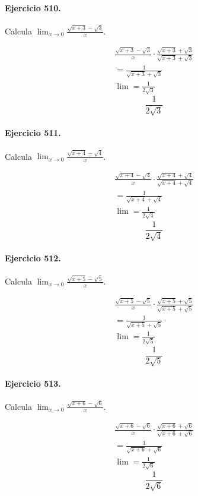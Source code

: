 \documentclass[11pt,a4paper]{article}
\begin{document}
\paragraph{Ejercicio 510.} Calcula $\displaystyle\lim_{x\to0}\frac{\sqrt{x+3}-\sqrt{3}}{x}$.

\[
\begin{aligned}
\frac{\sqrt{x+3}-\sqrt{3}}{x}\cdot \frac{\sqrt{x+3}+\sqrt{3}}{\sqrt{x+3}+\sqrt{3}}\\
=\frac{1}{\sqrt{x+3}+\sqrt{3}}\\
\lim=\frac{1}{2\sqrt{3}}
\end{aligned}
\]
\[\boxed{\frac{1}{2\sqrt{3}}}\]


\paragraph{Ejercicio 511.} Calcula $\displaystyle\lim_{x\to0}\frac{\sqrt{x+4}-\sqrt{4}}{x}$.

\[
\begin{aligned}
\frac{\sqrt{x+4}-\sqrt{4}}{x}\cdot \frac{\sqrt{x+4}+\sqrt{4}}{\sqrt{x+4}+\sqrt{4}}\\
=\frac{1}{\sqrt{x+4}+\sqrt{4}}\\
\lim=\frac{1}{2\sqrt{4}}
\end{aligned}
\]
\[\boxed{\frac{1}{2\sqrt{4}}}\]


\paragraph{Ejercicio 512.} Calcula $\displaystyle\lim_{x\to0}\frac{\sqrt{x+5}-\sqrt{5}}{x}$.

\[
\begin{aligned}
\frac{\sqrt{x+5}-\sqrt{5}}{x}\cdot \frac{\sqrt{x+5}+\sqrt{5}}{\sqrt{x+5}+\sqrt{5}}\\
=\frac{1}{\sqrt{x+5}+\sqrt{5}}\\
\lim=\frac{1}{2\sqrt{5}}
\end{aligned}
\]
\[\boxed{\frac{1}{2\sqrt{5}}}\]


\paragraph{Ejercicio 513.} Calcula $\displaystyle\lim_{x\to0}\frac{\sqrt{x+6}-\sqrt{6}}{x}$.

\[
\begin{aligned}
\frac{\sqrt{x+6}-\sqrt{6}}{x}\cdot \frac{\sqrt{x+6}+\sqrt{6}}{\sqrt{x+6}+\sqrt{6}}\\
=\frac{1}{\sqrt{x+6}+\sqrt{6}}\\
\lim=\frac{1}{2\sqrt{6}}
\end{aligned}
\]
\[\boxed{\frac{1}{2\sqrt{6}}}\]
\end{document}
